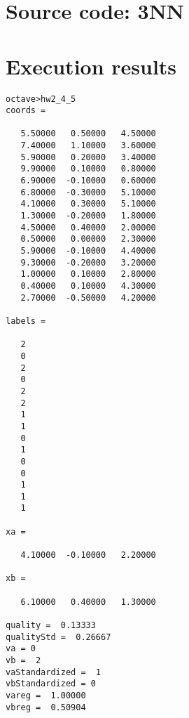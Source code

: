 \documentclass[a4paper,12pt]{article}
\begin{document}
\section*{Source code: 3NN}

\section*{Execution results}
\begin{lstlisting}
octave>hw2_4_5
coords =

   5.50000   0.50000   4.50000
   7.40000   1.10000   3.60000
   5.90000   0.20000   3.40000
   9.90000   0.10000   0.80000
   6.90000  -0.10000   0.60000
   6.80000  -0.30000   5.10000
   4.10000   0.30000   5.10000
   1.30000  -0.20000   1.80000
   4.50000   0.40000   2.00000
   0.50000   0.00000   2.30000
   5.90000  -0.10000   4.40000
   9.30000  -0.20000   3.20000
   1.00000   0.10000   2.80000
   0.40000   0.10000   4.30000
   2.70000  -0.50000   4.20000

labels =

   2
   0
   2
   0
   2
   2
   1
   1
   0
   1
   0
   0
   1
   1
   1

xa =

   4.10000  -0.10000   2.20000

xb =

   6.10000   0.40000   1.30000

quality =  0.13333
qualityStd =  0.26667
va = 0
vb =  2
vaStandardized =  1
vbStandardized = 0
vareg =  1.00000
vbreg =  0.50904
\end{lstlisting}
\begin{center}
\end{center}
\end{document}
